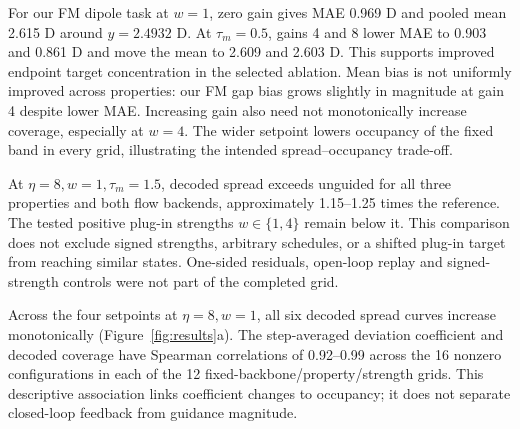 \documentclass{article}
\begin{document}
For our FM dipole task at $w=1$, zero gain gives MAE 0.969 D and pooled mean 2.615 D around $y=2.4932$ D. At $\tau_m=0.5$, gains 4 and 8 lower MAE to 0.903 and 0.861 D and move the mean to 2.609 and 2.603 D. This supports improved endpoint target concentration in the selected ablation. Mean bias is not uniformly improved across properties: our FM gap bias grows slightly in magnitude at gain 4 despite lower MAE. Increasing gain also need not monotonically increase coverage, especially at $w=4$. The wider setpoint lowers occupancy of the fixed band in every grid, illustrating the intended spread--occupancy trade-off.

At $\eta=8,w=1,\tau_m=1.5$, decoded spread exceeds unguided for all three properties and both flow backends, approximately 1.15--1.25 times the reference. The tested positive plug-in strengths $w\in\{1,4\}$ remain below it. This comparison does not exclude signed strengths, arbitrary schedules, or a shifted plug-in target from reaching similar states. One-sided residuals, open-loop replay and signed-strength controls were not part of the completed grid.

Across the four setpoints at $\eta=8,w=1$, all six decoded spread curves increase monotonically (Figure~\ref{fig:results}a). The step-averaged deviation coefficient and decoded coverage have Spearman correlations of 0.92--0.99 across the 16 nonzero configurations in each of the 12 fixed-backbone/property/strength grids. This descriptive association links coefficient changes to occupancy; it does not separate closed-loop feedback from guidance magnitude.
\end{document}
